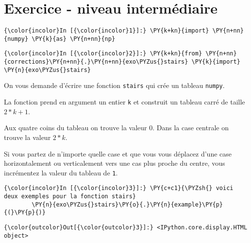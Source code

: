     
    
    
    

    

    \hypertarget{exercice---niveau-intermuxe9diaire}{%
\section{Exercice - niveau
intermédiaire}\label{exercice---niveau-intermuxe9diaire}}

    \begin{Verbatim}[commandchars=\\\{\}]
{\color{incolor}In [{\color{incolor}1}]:} \PY{k+kn}{import} \PY{n+nn}{numpy} \PY{k}{as} \PY{n+nn}{np}
\end{Verbatim}


    \begin{Verbatim}[commandchars=\\\{\}]
{\color{incolor}In [{\color{incolor}2}]:} \PY{k+kn}{from} \PY{n+nn}{corrections}\PY{n+nn}{.}\PY{n+nn}{exo\PYZus{}stairs} \PY{k}{import} \PY{n}{exo\PYZus{}stairs}
\end{Verbatim}


    On vous demande d'écrire une fonction \texttt{stairs} qui crée un
tableau \texttt{numpy}.

La fonction prend en argument un entier \texttt{k} et construit un
tableau carré de taille \(2*k+1\).

Aux quatre coins du tableau on trouve la valeur \(0\). Dans la case
centrale on trouve la valeur \(2*k\).

Si vous partez de n'importe quelle case et que vous vous déplacez d'une
case horizontalement ou verticalement vers une cas plus proche du
centre, vous incrémentez la valeur du tableau de \texttt{1}.

    \begin{Verbatim}[commandchars=\\\{\}]
{\color{incolor}In [{\color{incolor}3}]:} \PY{c+c1}{\PYZsh{} voici deux exemples pour la fonction stairs}
        \PY{n}{exo\PYZus{}stairs}\PY{o}{.}\PY{n}{example}\PY{p}{(}\PY{p}{)}
\end{Verbatim}


\begin{Verbatim}[commandchars=\\\{\}]
{\color{outcolor}Out[{\color{outcolor}3}]:} <IPython.core.display.HTML object>
\end{Verbatim}
            
